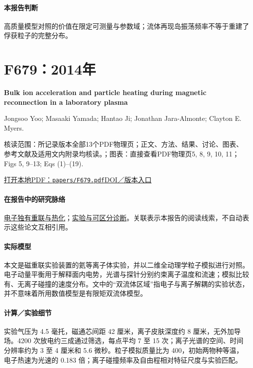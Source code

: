 \documentclass[UTF8,a4paper,11pt,openany,fontset=fandol]{ctexbook}
\begin{document}
\paragraph{本报告判断}高质量模型对照的价值在限定可测量与参数域；流体再现岛振荡频率不等于重建了俘获粒子的完整分布。

\section{F679：2014年}\label{paper:F679}

\textbf{Bulk ion acceleration and particle heating during magnetic reconnection in a laboratory plasma}\citep{F679}\

Jongsoo Yoo;  Masaaki Yamada;  Hantao Ji;  Jonathan Jara-Almonte;  Clayton E. Myers.

\textsf{核读范围：}所记录版本全部13个PDF物理页；正文、方法、结果、讨论、图表、参考文献及适用文内附录均核读。；\textsf{图表：}直接查看PDF物理页5, 8, 9, 10, 11；Figs 5,  9–13;  Eqs (1)–(19).

\href{run:../papers/F679.pdf}{打开本地PDF：\texttt{papers/F679.pdf}}\quad\href{https://doi.org/10.1063/1.4874331}{DOI／版本入口}

\paragraph{在报告中的研究脉络}\hyperref[story:energy]{电子独有重联与热化}；\hyperref[story:diagnostic]{实验与可区分诊断}。关联表示本报告的阅读线索，不自动表示这些论文互相引用。

\paragraph{实际模型}本文是磁重联实验装置的氦等离子体实验，并以二维全动理学粒子模拟进行对照。电子动量平衡用于解释面内电势，光谱与探针分别约束离子温度和流速；模拟比较有、无离子碰撞的速度分布。文中的“双流体区域”指电子与离子解耦的实验状态，并不意味着所用数值模型是有限矩双流体模型。

\paragraph{计算／实验细节}实验气压为 4.5 毫托，磁通芯间距 42 厘米，离子皮肤深度约 8 厘米，无外加导场。4200 次放电约三成通过筛选，每点平均 7 至 15 次；离子光谱的空间、时间分辨率约为 3 至 4 厘米和 5.6 微秒。粒子模拟质量比为 400，初始两物种等温，电子热速为光速的 0.183 倍；离子碰撞频率及自由程相对特征尺度与实验匹配。
\end{document}
